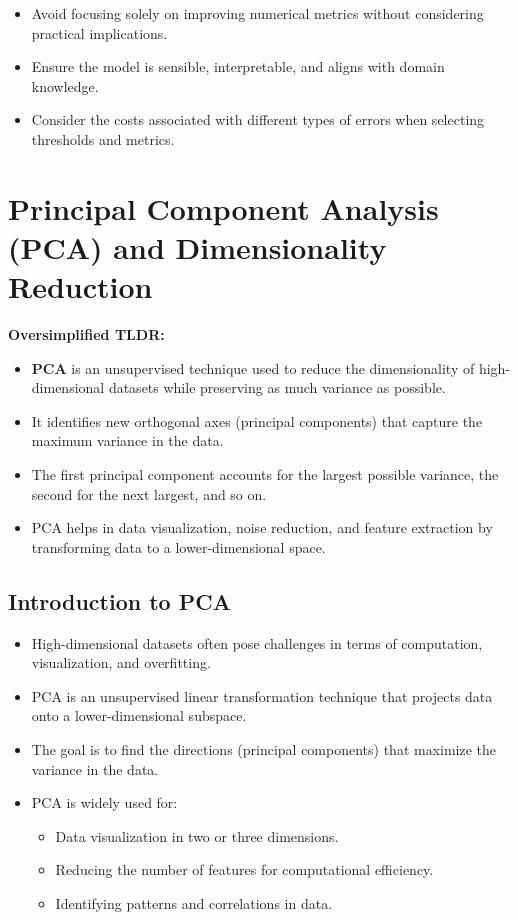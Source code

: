 \documentclass{article}
\begin{document}
\begin{itemize}
    \item Avoid focusing solely on improving numerical metrics without considering practical implications.
    \item Ensure the model is sensible, interpretable, and aligns with domain knowledge.
    \item Consider the costs associated with different types of errors when selecting thresholds and metrics.
\end{itemize}

\section{Principal Component Analysis (PCA) and Dimensionality Reduction}

\textbf{Oversimplified TLDR:}
\begin{itemize}
    \item \textbf{PCA} is an unsupervised technique used to reduce the dimensionality of high-dimensional datasets while preserving as much variance as possible.
    \item It identifies new orthogonal axes (principal components) that capture the maximum variance in the data.
    \item The first principal component accounts for the largest possible variance, the second for the next largest, and so on.
    \item PCA helps in data visualization, noise reduction, and feature extraction by transforming data to a lower-dimensional space.
\end{itemize}

\subsection{Introduction to PCA}

\begin{itemize}
    \item High-dimensional datasets often pose challenges in terms of computation, visualization, and overfitting.
    \item PCA is an unsupervised linear transformation technique that projects data onto a lower-dimensional subspace.
    \item The goal is to find the directions (principal components) that maximize the variance in the data.
    \item PCA is widely used for:
    \begin{itemize}
        \item Data visualization in two or three dimensions.
        \item Reducing the number of features for computational efficiency.
        \item Identifying patterns and correlations in data.
    \end{itemize}
\end{itemize}
\end{document}
